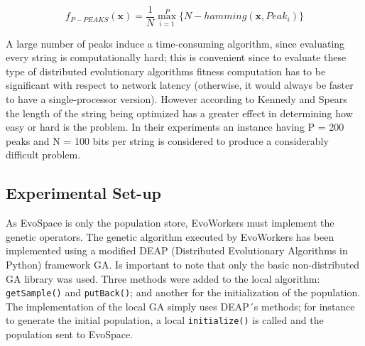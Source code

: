 \documentclass{sig-alternate}
\begin{document}
\begin{equation}
f_{P-PEAKS}(\mathbf{x})=\frac{1}{N} \overset{P}{\max_{i=1}} \{N-hamming(\mathbf{x},Peak_i)   \}
\end{equation}

A large number of peaks induce a time-consuming algorithm,
since evaluating every string is computationally hard; this is
convenient since to evaluate these type of distributed evolutionary
algorithms fitness computation has to be significant with respect to
network latency (otherwise, it would always be faster to have a
single-processor version). However
according to Kennedy and Spears \cite{Kennedy:1998ch} the length of
the string being optimized has a greater effect in determining how
easy or hard is the problem. In their experiments an instance having P
= 200 peaks and N = 100 bits per string is considered to produce a
considerably difficult problem.

\subsection{Experimental Set-up}
As EvoSpace is only the population store, EvoWorkers must implement 
the genetic operators. The genetic algorithm executed by EvoWorkers has been implemented 
using a modified DEAP (Distributed Evolutionary Algorithms in Python) 
framework \cite{DEAP_JMLR2012} GA. Is important to note that only the basic non-distributed GA 
library was used. Three methods were added to the local algorithm: 
{ \tt  getSample()} and  {\tt putBack()}; and  another for the  initialization 
of the population. The implementation of the local GA simply uses DEAP´s methods; for instance to 
generate the initial population, a local {\tt initialize()} is called 
and the population sent to EvoSpace.
\end{document}
